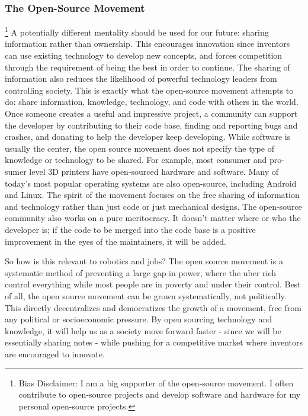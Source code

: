 \subsubsection{The Open-Source Movement} 
\footnote{Bias Disclaimer: I am a big supporter of the open-source movement. I often contribute to open-source projects and develop software and hardware for my personal open-source projects.}
\label{subsec:open-source} 
A potentially different mentality should be used for our future: sharing information rather than ownership. This encourages innovation since inventors can use existing technology to develop new concepts, and forces competition through the requirement of being the best in order to continue. The sharing of information also reduces the likelihood of powerful technology leaders from controlling society. This is exactly what the open-source movement attempts to do: share information, knowledge, technology, and code with others in the world. Once someone creates a useful and impressive project, a community can support the developer by contributing to their code base, finding and reporting bugs and crashes, and donating to help the developer keep developing. While software is usually the center, the open source movement does not specify the type of knowledge or technology to be shared. For example, most consumer and pro-sumer level 3D printers have open-sourced hardware and software. Many of today's most popular operating systems are also open-source, including Android and Linux. The spirit of the movement focuses on the free sharing of information and technology rather than just code or just mechanical designs. The open-source community also works on a pure meritocracy. It doesn't matter where or who the developer is; if the code to be merged into the code base is a positive improvement in the eyes of the maintainers, it will be added.

So how is this relevant to robotics and jobs? The open source movement is a systematic method of preventing a large gap in power, where the uber rich control everything while most people are in poverty and under their control. Best of all, the open source movement can be grown systematically, not politically. This directly decentralizes and democratizes the growth of a movement, free from any political or socioeconomic pressure. By open sourcing technology and knowledge, it will help us as a society move forward faster - since we will be essentially sharing notes - while pushing for a competitive market where inventors are encouraged to innovate. 

